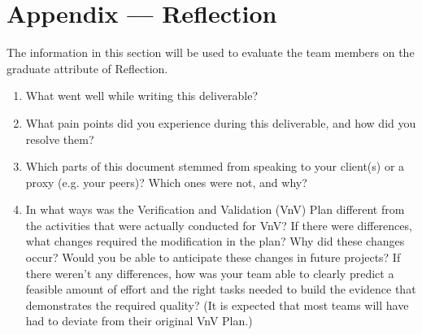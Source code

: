 \documentclass[12pt, titlepage]{article}
\begin{document}
\section*{Appendix --- Reflection}

The information in this section will be used to evaluate the team members on the
graduate attribute of Reflection.



\begin{enumerate}
  \item What went well while writing this deliverable? 
  \item What pain points did you experience during this deliverable, and how
    did you resolve them?
  \item Which parts of this document stemmed from speaking to your client(s) or
  a proxy (e.g. your peers)? Which ones were not, and why?
  \item In what ways was the Verification and Validation (VnV) Plan different
  from the activities that were actually conducted for VnV?  If there were
  differences, what changes required the modification in the plan?  Why did
  these changes occur?  Would you be able to anticipate these changes in future
  projects?  If there weren't any differences, how was your team able to clearly
  predict a feasible amount of effort and the right tasks needed to build the
  evidence that demonstrates the required quality?  (It is expected that most
  teams will have had to deviate from their original VnV Plan.)
\end{enumerate}
\end{document}
